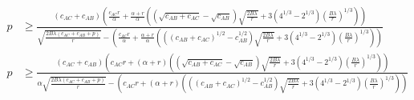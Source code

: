 \documentclass[12pt]{article}
\theoremstyle{plain}
\theoremstyle{remark}
\theoremstyle{definition}
\renewcommand{\geq}{\geqslant}
\renewcommand{\geq}{\geqslant}
\begin{document}
\begin{align}
  p & \geq \frac{(c_{AC}+c_{AB})(\frac{c_{AC}r}{\alpha} + \frac{\alpha + r}{\alpha}((\sqrt{c_{AB}+ c_{AC}}-\sqrt{c_{AB}})\sqrt{\frac{2B\lambda }{r}} + 3(4^{1/3}-2^{1/3})(\frac{B\lambda}{r})^{1/3}))}{\sqrt{\frac{2B\lambda (c_{AC}+c_{AB}+p)}{r}}-(\frac{c_{AC}r}{\alpha} + \frac{\alpha + r}{\alpha}(((c_{AB}+ c_{AC})^{1/2}-c_{AB}^{1/2})\sqrt{\frac{2B\lambda }{r}} + 3(4^{1/3}-2^{1/3})(\frac{B\lambda}{r})^{1/3}))}\\
  p & \geq \frac{(c_{AC}+c_{AB})(c_{AC}r + (\alpha + r)((\sqrt{c_{AB}+ c_{AC}}-\sqrt{c_{AB}})\sqrt{\frac{2B\lambda }{r}} + 3(4^{1/3}-2^{1/3})(\frac{B\lambda}{r})^{1/3}))}{\alpha\sqrt{\frac{2B\lambda (c_{AC}+c_{AB}+p)}{r}}-(c_{AC}r + (\alpha + r)(((c_{AB}+ c_{AC})^{1/2}-c_{AB}^{1/2})\sqrt{\frac{2B\lambda }{r}} + 3(4^{1/3}-2^{1/3})(\frac{B\lambda}{r})^{1/3}))}
\end{align}
\end{document}
